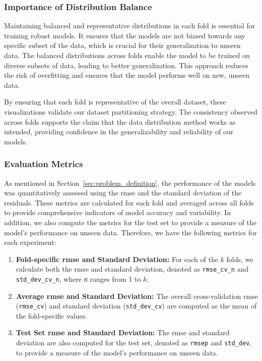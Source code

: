 \subsubsection{Importance of Distribution Balance}
Maintaining balanced and representative distributions in each fold is essential for training robust models.
It ensures that the models are not biased towards any specific subset of the data, which is crucial for their generalization to unseen data.
The balanced distributions across folds enable the model to be trained on diverse subsets of data, leading to better generalization.
This approach reduces the risk of overfitting and ensures that the model performs well on new, unseen data.

By ensuring that each fold is representative of the overall dataset, these visualizations validate our dataset partitioning strategy.
The consistency observed across folds supports the claim that the data distribution method works as intended, providing confidence in the generalizability and reliability of our models.


\subsubsection{Evaluation Metrics}\label{subsubsec:evaluation_metrics}
As mentioned in Section~\ref{sec:problem_definition}, the performance of the models was quantitatively assessed using the \gls{rmse} and the standard deviation of the residuals.
These metrics are calculated for each fold and averaged across all folds to provide comprehensive indicators of model accuracy and variability.
In addition, we also compute the metrics for the test set to provide a measure of the model's performance on unseen data.
Therefore, we have the following metrics for each experiment:
\begin{enumerate}
    \item \textbf{Fold-specific \gls{rmse} and Standard Deviation:} For each of the $k$ folds, we calculate both the \gls{rmse} and standard deviation, denoted as \texttt{rmse\_cv\_n} and \texttt{std\_dev\_cv\_n}, where \texttt{n} ranges from 1 to $k$.
    \item \textbf{Average \gls{rmse} and Standard Deviation:} The overall cross-validation \gls{rmse} (\texttt{rmse\_cv}) and standard deviation (\texttt{std\_dev\_cv}) are computed as the mean of the fold-specific values.
    \item \textbf{Test Set \gls{rmse} and Standard Deviation:} The \gls{rmse} and standard deviation are also computed for the test set, denoted as \texttt{rmsep} and \texttt{std\_dev}, to provide a measure of the model's performance on unseen data.
\end{enumerate}

